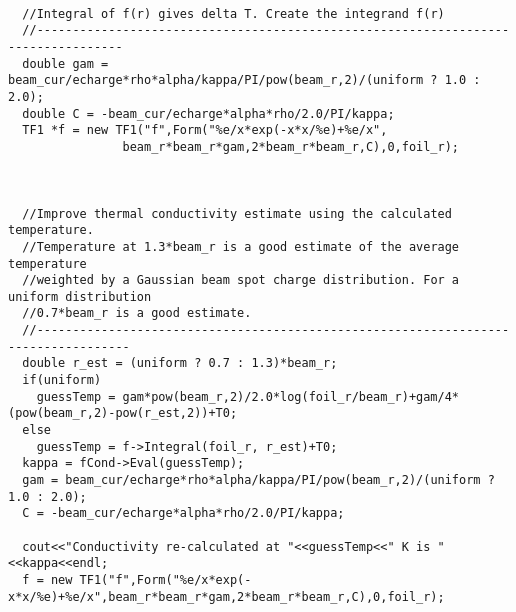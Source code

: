 \documentclass[12pt]{article}
\begin{document}
\begin{lstlisting}
  
  //Integral of f(r) gives delta T. Create the integrand f(r) 
  //----------------------------------------------------------------------------------
  double gam = beam_cur/echarge*rho*alpha/kappa/PI/pow(beam_r,2)/(uniform ? 1.0 : 2.0);
  double C = -beam_cur/echarge*alpha*rho/2.0/PI/kappa;
  TF1 *f = new TF1("f",Form("%e/x*exp(-x*x/%e)+%e/x",
			    beam_r*beam_r*gam,2*beam_r*beam_r,C),0,foil_r);


  
  //Improve thermal conductivity estimate using the calculated temperature.
  //Temperature at 1.3*beam_r is a good estimate of the average temperature
  //weighted by a Gaussian beam spot charge distribution. For a uniform distribution
  //0.7*beam_r is a good estimate.
  //-----------------------------------------------------------------------------------
  double r_est = (uniform ? 0.7 : 1.3)*beam_r;
  if(uniform)
    guessTemp = gam*pow(beam_r,2)/2.0*log(foil_r/beam_r)+gam/4*(pow(beam_r,2)-pow(r_est,2))+T0;
  else
    guessTemp = f->Integral(foil_r, r_est)+T0;
  kappa = fCond->Eval(guessTemp);
  gam = beam_cur/echarge*rho*alpha/kappa/PI/pow(beam_r,2)/(uniform ? 1.0 : 2.0);
  C = -beam_cur/echarge*alpha*rho/2.0/PI/kappa;

  cout<<"Conductivity re-calculated at "<<guessTemp<<" K is "<<kappa<<endl;
  f = new TF1("f",Form("%e/x*exp(-x*x/%e)+%e/x",beam_r*beam_r*gam,2*beam_r*beam_r,C),0,foil_r);




\end{lstlisting}
\end{document}
